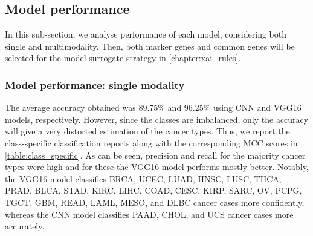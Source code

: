\subsection{Model performance}
In this sub-section, we analyse performance of each model, considering both single and multimodality. Then, both marker genes and common genes will be selected for the model surrogate strategy in \cref{chapter:xai_rules}.

\subsubsection{Model performance: single modality}
The average accuracy obtained was 89.75\% and 96.25\% using CNN and VGG16 models, respectively. However, since the classes are imbalanced, only the accuracy will give a very distorted estimation of the cancer types. Thus, we report the class-specific classification reports along with the corresponding MCC scores in \cref{table:class_specific}. As can be seen, precision and recall for the majority cancer types were high and for these the VGG16 model performs mostly better. Notably, the VGG16 model classifies BRCA, UCEC, LUAD, HNSC, LUSC, THCA, PRAD, BLCA, STAD, KIRC, LIHC, COAD, CESC, KIRP, SARC, OV, PCPG, TGCT, GBM, READ, LAML, MESO, and DLBC cancer cases more confidently, whereas the CNN model classifies PAAD, CHOL, and UCS cancer cases more accurately. 

